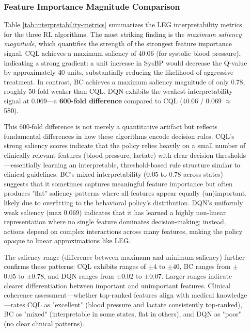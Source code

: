 \subsubsection{Feature Importance Magnitude Comparison}

Table \ref{tab:interpretability-metrics} summarizes the LEG interpretability metrics for the three RL algorithms. The most striking finding is the \textit{maximum saliency magnitude}, which quantifies the strength of the strongest feature importance signal. CQL achieves a maximum saliency of 40.06 (for systolic blood pressure), indicating a strong gradient: a unit increase in SysBP would decrease the Q-value by approximately 40 units, substantially reducing the likelihood of aggressive treatment. In contrast, BC achieves a maximum saliency magnitude of only 0.78, roughly 50-fold weaker than CQL. DQN exhibits the weakest interpretability signal at 0.069—a \textbf{600-fold difference} compared to CQL (40.06 / 0.069 $\approx$ 580).

This 600-fold difference is not merely a quantitative artifact but reflects fundamental differences in how these algorithms encode decision rules. CQL's strong saliency scores indicate that the policy relies heavily on a small number of clinically relevant features (blood pressure, lactate) with clear decision thresholds—essentially learning an interpretable, threshold-based rule structure similar to clinical guidelines. BC's mixed interpretability (0.05 to 0.78 across states) suggests that it sometimes captures meaningful feature importance but often produces "flat" saliency patterns where all features appear equally (un)important, likely due to overfitting to the behavioral policy's distribution. DQN's uniformly weak saliency (max 0.069) indicates that it has learned a highly non-linear representation where no single feature dominates decision-making; instead, actions depend on complex interactions across many features, making the policy opaque to linear approximations like LEG.

The saliency range (difference between maximum and minimum saliency) further confirms these patterns: CQL exhibits ranges of $\pm$4 to $\pm$40, BC ranges from $\pm$0.05 to $\pm$0.78, and DQN ranges from $\pm$0.02 to $\pm$0.07. Larger ranges indicate clearer differentiation between important and unimportant features. Clinical coherence assessment—whether top-ranked features align with medical knowledge—rates CQL as "excellent" (blood pressure and lactate consistently top-ranked), BC as "mixed" (interpretable in some states, flat in others), and DQN as "poor" (no clear clinical patterns).

